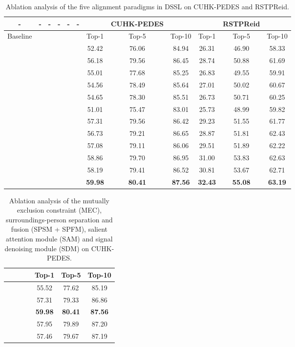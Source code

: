\documentclass[sigconf]{acmart}
\begin{document}
\begin{table*}
	\caption{Ablation analysis of the five alignment paradigms in DSSL on CUHK-PEDES and RSTPReid.}
	\label{tab:alignment}
	\begin{tabular}{c |ccccc|ccc | ccc}
		\toprule
		- & - & - & - & - & - & & CUHK-PEDES & & & RSTPReid &\\
		\midrule
		Baseline &  &  &  &  &  & Top-1 & Top-5 & Top-10 & Top-1 & Top-5 & Top-10 \\
		\midrule		
		 &  &  &  &  &  & 52.42 & 76.06 & 84.94 & 26.31 & 46.90 & 58.33 \\
		\midrule
		 &  &  &  &  &  & 56.18 & 79.56 & 86.45 & 28.74 & 50.88 & 61.69 \\
		 &  &  &  &  &  & 55.01 & 77.68 & 85.25 & 26.83 & 49.55 & 59.91 \\
		 &  &  &  &  &  & 54.56 & 78.49 & 85.64 & 27.01 & 50.02 & 60.67 \\
		 &  &  &  &  &  & 54.65 & 78.30 & 85.51 & 26.73 & 50.71 & 60.25 \\
		 &  &  &  &  &  & 51.01 & 75.47 & 83.01 & 25.73 & 48.99 & 59.82 \\
		 &  &  &  &  &  & 57.31 & 79.56 & 86.42 & 29.23 & 51.55 & 61.77 \\
		 &  &  &  &  &  & 56.73 & 79.21 & 86.65 & 28.87 & 51.81 & 62.43 \\
		 &  &  &  &  &  & 57.08 & 79.11 & 86.06 & 29.51 & 51.89 & 62.22\\
		 &  &  &  &  &  & 58.86 & 79.70 & 86.95 & 31.00 & 53.83 & 62.63 \\
		 &  &  &  &  &  & 58.19 & 79.41 & 86.52 & 30.81 & 53.67 & 62.71 \\
		\midrule
		 &  &  &  &  &  & \textbf{59.98} & \textbf{80.41} & \textbf{87.56} & \textbf{32.43} & \textbf{55.08} & \textbf{63.19} \\
		\bottomrule
	\end{tabular}
\end{table*}

\begin{table}
	\caption{Ablation analysis of the mutually exclusion constraint (MEC), surroundings-person separation and fusion (SPSM + SPFM), salient attention module (SAM) and signal denoising module (SDM) on CUHK-PEDES.}
	\label{tab:sp}
	\begin{tabular}{cc|c|c|ccc}
		\toprule
		 &  &  &  & Top-1 & Top-5 & Top-10 \\
		\midrule
		 &  &  &  & 55.52 & 77.62 & 85.19 \\
		 &  &  &  & 57.31 & 79.33 & 86.86 \\
		\midrule
		 &  &  &  & \textbf{59.98} & \textbf{80.41} & \textbf{87.56} \\
		\midrule
		 &  &  &  & 57.95 & 79.89 & 87.20 \\
		 &  &  &  & 57.46 & 79.67 & 87.19 \\
		\bottomrule
	\end{tabular}
\end{table}
\end{document}

